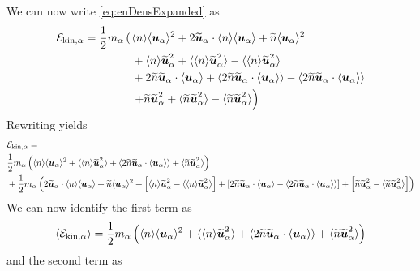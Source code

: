 We can now write \cref{eq:enDensExpanded} as
%
\begin{align*}
     \mathcal{E}_{\text{kin},\alpha} =
        \frac{1}{2}m_\alpha\left(\right.&
            \langle{n}\rangle \langle{\boldsymbol{u}_\alpha}\rangle^2
             + 2 \widetilde{ \boldsymbol{u}}_\alpha\cdot \langle{n}\rangle \langle{\boldsymbol{u}_\alpha}\rangle
             + \widetilde{ n} \langle{\boldsymbol{u}_\alpha}\rangle^2
             \\
             &
             + \langle{n}\rangle\widetilde{ \boldsymbol{u}}_\alpha^2
             + \langle{\langle{n}\rangle\widetilde{ \boldsymbol{u}}_\alpha^2}\rangle
             - \langle{\langle{n}\rangle\widetilde{ \boldsymbol{u}}_\alpha^2}\rangle
             \\
             &
             + 2 \widetilde{ n} \widetilde{ \boldsymbol{u}}_\alpha\cdot\langle{\boldsymbol{u}_\alpha}\rangle
             + \langle{2 \widetilde{ n} \widetilde{ \boldsymbol{u}}_\alpha\cdot\langle{\boldsymbol{u}_\alpha}\rangle}\rangle
             - \langle{2 \widetilde{ n} \widetilde{ \boldsymbol{u}}_\alpha\cdot\langle{\boldsymbol{u}_\alpha}\rangle}\rangle
             \\
             &\left.
             + \widetilde{ n}\widetilde{ \boldsymbol{u}}_\alpha^2
             + \langle{\widetilde{ n}\widetilde{ \boldsymbol{u}}_\alpha^2}\rangle
             - \langle{\widetilde{ n}\widetilde{ \boldsymbol{u}}_\alpha^2}\rangle
             \right)
\end{align*}
%
Rewriting yields
%
\begin{align*}
     &\mathcal{E}_{\text{kin},\alpha} =
     \\&
        \frac{1}{2}m_\alpha\left(
            \langle{n}\rangle \langle{\boldsymbol{u}_\alpha}\rangle^2
             + \langle{\langle{n}\rangle\widetilde{ \boldsymbol{u}}_\alpha^2}\rangle
             + \langle{2 \widetilde{ n} \widetilde{ \boldsymbol{u}}_\alpha\cdot\langle{\boldsymbol{u}_\alpha}\rangle}\rangle
             + \langle{\widetilde{ n}\widetilde{ \boldsymbol{u}}_\alpha^2}\rangle
        \right)
             \\
             &+
        \frac{1}{2}m_\alpha\left(
              2 \widetilde{ \boldsymbol{u}}_\alpha\cdot \langle{n}\rangle \langle{\boldsymbol{u}_\alpha}\rangle
             + \widetilde{ n} \langle{\boldsymbol{u}_\alpha}\rangle^2
             +
             \left[\langle{n}\rangle\widetilde{ \boldsymbol{u}}_\alpha^2
                - \langle{\langle{n}\rangle\widetilde{ \boldsymbol{u}}_\alpha^2}\rangle
             \right]
             +
             \left[2 \widetilde{ n} \widetilde{ \boldsymbol{u}}_\alpha\cdot\langle{\boldsymbol{u}_\alpha}\rangle
                - \langle{2 \widetilde{ n} \widetilde{ \boldsymbol{u}}_\alpha\cdot\langle{\boldsymbol{u}_\alpha}\rangle}\rangle
             \right]
             +
             \left[
               \widetilde{ n}\widetilde{ \boldsymbol{u}}_\alpha^2
             - \langle{\widetilde{ n}\widetilde{ \boldsymbol{u}}_\alpha^2}\rangle
             \right]
             \right)
\end{align*}
%
We can now identify the first term as
%
\begin{align}
     \expt{\mathcal{E}_{\text{kin},\a}} =
        \frac{1}{2}m_\a\L(
            \expt{n} \expt{\ve{u}_\a}^2
             + \expt{\expt{n}\wt{\ve{u}}_\a^2}
             + \expt{2 \wt{n} \wt{\ve{u}}_\a\cdot\expt{\ve{u}_\a}}
             + \expt{\wt{n}\wt{\ve{u}}_\a^2}
        \R)
    \label{eq:enDensAvg}
\end{align}
%
and the second term as

